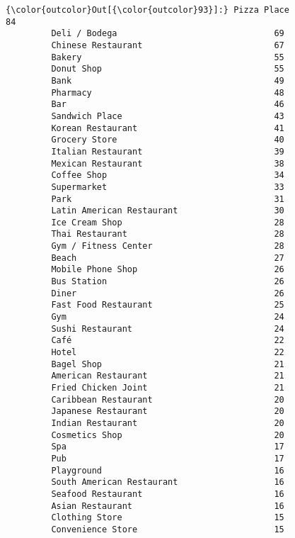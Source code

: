 \documentclass[11pt]{article}
\begin{document}
\begin{Verbatim}[commandchars=\\\{\}]
{\color{outcolor}Out[{\color{outcolor}93}]:} Pizza Place                                 84
         Deli / Bodega                               69
         Chinese Restaurant                          67
         Bakery                                      55
         Donut Shop                                  55
         Bank                                        49
         Pharmacy                                    48
         Bar                                         46
         Sandwich Place                              43
         Korean Restaurant                           41
         Grocery Store                               40
         Italian Restaurant                          39
         Mexican Restaurant                          38
         Coffee Shop                                 34
         Supermarket                                 33
         Park                                        31
         Latin American Restaurant                   30
         Ice Cream Shop                              28
         Thai Restaurant                             28
         Gym / Fitness Center                        28
         Beach                                       27
         Mobile Phone Shop                           26
         Bus Station                                 26
         Diner                                       26
         Fast Food Restaurant                        25
         Gym                                         24
         Sushi Restaurant                            24
         Café                                        22
         Hotel                                       22
         Bagel Shop                                  21
         American Restaurant                         21
         Fried Chicken Joint                         21
         Caribbean Restaurant                        20
         Japanese Restaurant                         20
         Indian Restaurant                           20
         Cosmetics Shop                              20
         Spa                                         17
         Pub                                         17
         Playground                                  16
         South American Restaurant                   16
         Seafood Restaurant                          16
         Asian Restaurant                            16
         Clothing Store                              15
         Convenience Store                           15

\end{Verbatim}
\end{document}
